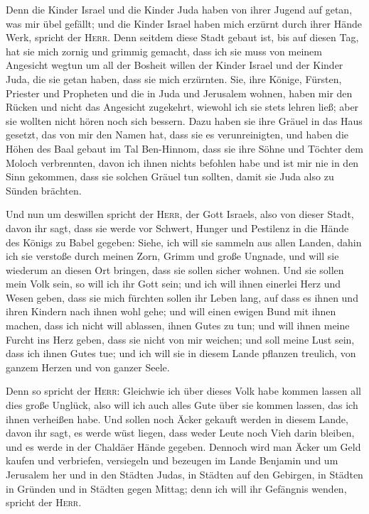  Denn die Kinder Israel und die Kinder Juda haben von
ihrer Jugend auf getan, was mir übel gefällt; und die Kinder Israel
haben mich erzürnt durch ihrer Hände Werk, spricht der \textsc{Herr}.
 Denn seitdem diese Stadt gebaut ist, bis auf diesen Tag,
hat sie mich zornig und grimmig gemacht, dass ich sie muss von meinem
Angesicht wegtun  um all der Bosheit willen der Kinder
Israel und der Kinder Juda, die sie getan haben, dass sie mich
erzürnten. Sie, ihre Könige, Fürsten, Priester und Propheten und die in
Juda und Jerusalem wohnen,  haben mir den Rücken und
nicht das Angesicht zugekehrt, wiewohl ich sie stets lehren ließ; aber
sie wollten nicht hören noch sich bessern.  Dazu haben
sie ihre Gräuel in das Haus gesetzt, das von mir den Namen hat, dass sie
es verunreinigten,  und haben die Höhen des Baal gebaut
im Tal Ben-Hinnom, dass sie ihre Söhne und Töchter dem Moloch
verbrennten, davon ich ihnen nichts befohlen habe und ist mir nie in den
Sinn gekommen, dass sie solchen Gräuel tun sollten, damit sie Juda also
zu Sünden brächten.

 Und nun um deswillen spricht der \textsc{Herr}, der Gott
Israels, also von dieser Stadt, davon ihr sagt, dass sie werde vor
Schwert, Hunger und Pestilenz in die Hände des Königs zu Babel gegeben:
 Siehe, ich will sie sammeln aus allen Landen, dahin ich
sie verstoße durch meinen Zorn, Grimm und große Ungnade, und will sie
wiederum an diesen Ort bringen, dass sie sollen sicher wohnen.
 Und sie sollen mein Volk sein, so will ich ihr Gott
sein;  und ich will ihnen einerlei Herz und Wesen geben,
dass sie mich fürchten sollen ihr Leben lang, auf dass es ihnen und
ihren Kindern nach ihnen wohl gehe;  und will einen
ewigen Bund mit ihnen machen, dass ich nicht will ablassen, ihnen Gutes
zu tun; und will ihnen meine Furcht ins Herz geben, dass sie nicht von
mir weichen;  und soll meine Lust sein, dass ich ihnen
Gutes tue; und ich will sie in diesem Lande pflanzen treulich, von
ganzem Herzen und von ganzer Seele.

 Denn so spricht der \textsc{Herr}: Gleichwie ich über
dieses Volk habe kommen lassen all dies große Unglück, also will ich
auch alles Gute über sie kommen lassen, das ich ihnen verheißen habe.
 Und sollen noch Äcker gekauft werden in diesem Lande,
davon ihr sagt, es werde wüst liegen, dass weder Leute noch Vieh darin
bleiben, und es werde in der Chaldäer Hände gegeben. 
Dennoch wird man Äcker um Geld kaufen und verbriefen, versiegeln und
bezeugen im Lande Benjamin und um Jerusalem her und in den Städten
Judas, in Städten auf den Gebirgen, in Städten in Gründen und in Städten
gegen Mittag; denn ich will ihr Gefängnis wenden, spricht der
\textsc{Herr}.

